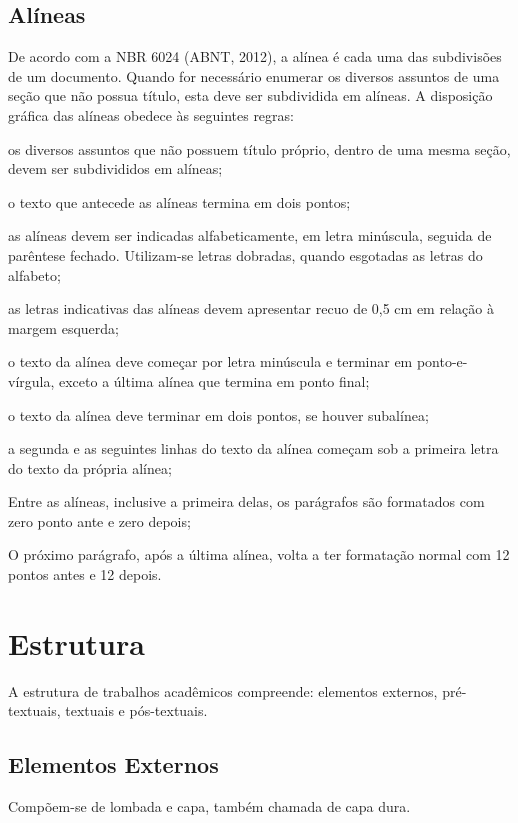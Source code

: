 \documentclass[a4paper,12pt]{article}  %
\begin{document}
\begin{ElementosTextuais}
\begin{Desenvolvimento}
\subsection{Alíneas}
De acordo com a NBR 6024 (ABNT, 2012), a alínea é cada uma das subdivisões de um documento. Quando for necessário enumerar os diversos assuntos de uma seção que não possua título, esta deve ser subdividida em alíneas. A disposição gráfica das alíneas obedece às seguintes regras:

\begin{alphaitemize}
  \item os diversos assuntos que não possuem título próprio, dentro de uma mesma seção, devem ser subdivididos em alíneas;
  \item o texto que antecede as alíneas termina em dois pontos;
  \item as alíneas devem ser indicadas alfabeticamente, em letra minúscula, seguida de parêntese fechado. Utilizam-se letras dobradas, quando esgotadas as letras do alfabeto;
  \item as letras indicativas das alíneas devem apresentar recuo de 0,5 cm em relação à margem esquerda;
  \item o texto da alínea deve começar por letra minúscula e terminar em ponto-e-vírgula, exceto a última alínea que termina em ponto final;
  \item o texto da alínea deve terminar em dois pontos, se houver subalínea;
  \item a segunda e as seguintes linhas do texto da alínea começam sob a primeira letra do texto da própria alínea;
  \item Entre as alíneas, inclusive a primeira delas, os parágrafos são formatados com zero ponto ante e zero depois;
  \item O próximo parágrafo, após a última alínea, volta a ter formatação normal com 12 pontos antes e 12 depois.
\end{alphaitemize}

\section{Estrutura}
A estrutura de trabalhos acadêmicos compreende: elementos externos, pré-textuais, textuais e pós-textuais.

\subsection{Elementos Externos}
Compõem-se de lombada e capa, também chamada de capa dura.


\end{Desenvolvimento}
\end{ElementosTextuais}
\end{document}
